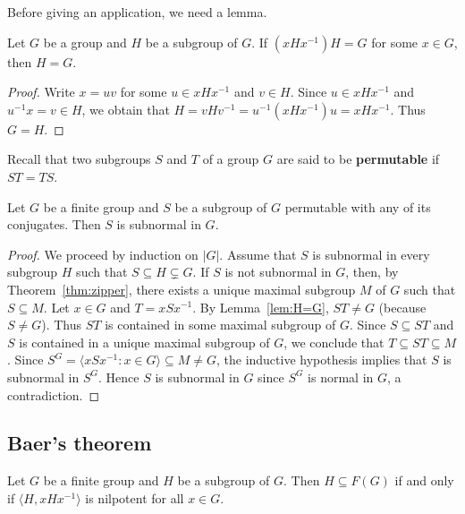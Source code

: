 Before giving an application, we need a lemma. 

\begin{lemma}
	\label{lem:H=G}
	Let $G$ be a group and $H$ be a subgroup of $G$. If $(xHx^{-1})H=G$ for some 
	$x\in G$, then $H=G$.
\end{lemma}

\begin{proof}
	Write $x=uv$ for some $u\in xHx^{-1}$ and $v\in H$. Since $u\in xHx^{-1}$ and
	$u^{-1}x=v\in H$, we obtain that $H=vHv^{-1}=u^{-1}(xHx^{-1})u=xHx^{-1}$. Thus
	$G=H$. 
\end{proof}

Recall that two subgroups $S$ and $T$ of a group $G$ are said to be
\textbf{permutable} if $ST=TS$. 

\begin{theorem}
	Let $G$ be a finite group and $S$ be a subgroup of $G$ permutable with any of
	its conjugates. Then $S$ is subnormal in $G$. 
\end{theorem}

\begin{proof}
	We proceed by induction on $|G|$. Assume that $S$ is subnormal in 
	every subgroup $H$ such that $S\subseteq H\subsetneq G$.  If $S$ is not subnormal in $G$, 
	then, by Theorem~\ref{thm:zipper}, there exists a unique maximal subgroup $M$ of $G$ 
	such that $S\subseteq M$. Let $x\in G$ and 
	$T=xSx^{-1}$. By Lemma~\ref{lem:H=G}, $ST\ne G$ (because $S\ne G$). Thus 
	$ST$ is contained in some maximal subgroup of $G$. Since 
	$S\subseteq ST$ and $S$ is contained in a unique maximal subgroup of $G$, we conclude that 
	$T\subseteq ST\subseteq M$.  Since $S^G=\langle xSx^{-1}:x\in
	G\rangle\subseteq M\ne G$, the inductive hypothesis implies that $S$ is subnormal in
	$S^G$. Hence $S$ is subnormal in $G$ since $S^G$ is normal in $G$, a contradiction. 
\end{proof}

\subsection{Baer's theorem}

\begin{theorem}[Baer]
	\label{thm:Baer}
	Let $G$ be a finite group and $H$ be a subgroup of $G$. Then $H\subseteq
	F(G)$ if and only if $\langle H,xHx^{-1}\rangle$ is nilpotent for all 
	$x\in G$.
\end{theorem}

